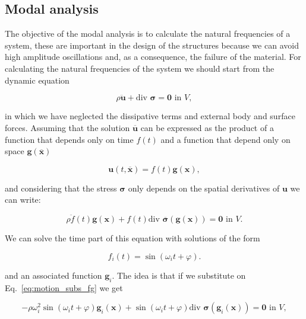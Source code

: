\documentclass[review]{elsarticle}
\begin{document}

\subsection{Modal analysis}

The objective of the modal analysis is to calculate the natural frequencies
of a system, these are important in the design of the structures because we can avoid 
high amplitude oscillations and, as a consequence, the failure of the material. 
For calculating the natural frequencies of the system we should start from the
dynamic equation  

\begin{equation}
\rho \ddot{\bm{u}} + \text{div } \bm{\sigma} = \bm{0} \text{ in } V,
\label{eq:motion}
\end{equation}

\noindent
in which we have neglected the dissipative terms and external body and surface
forces.
Assuming that the solution $\overline{\bm{u}}$ can be expressed as the
product of a function that depends only on time $f(t)$ and a function that
depend only on space $\bm{g}(\overline{\bm{x}})$ 

\begin{equation}
\bm{u}(t,\overline{\bm{x}}) = f(t) \bm{g}(\bm{x}),
\label{eq:u_fg}
\end{equation}

\noindent
and considering that the stress $\bm{\sigma}$ only depends on the
spatial derivatives of $\bm{u}$ we can write:

\begin{equation}
\rho \ddot{f}(t) \bm{g}(\bm{x}) +
f(t) \text{div } \overline{\bm{\sigma}}(\bm{g}(\bm{x}))
= \bm{0} \text{ in } V.
\label{eq:motion_subs_fg}
\end{equation}

We can solve the time part of this equation with solutions of the form

\begin{equation}
f_i(t) = \sin (\omega_i t + \varphi).
\label{eq:f_sin}
\end{equation}

\noindent
and an associated function $\bm{g}_i$. The idea is that if we substitute 
on Eq.~\ref{eq:motion_subs_fg} we get

\begin{equation}
- \rho \omega_i^2 \sin (\omega_i t + \varphi) \bm{g}_i(\bm{x}) +
\sin (\omega_i t + \varphi) \text{div } \bm{\sigma}(\bm{g}_i(\bm{x})) 
= \bm{0} \text{ in } V,
\label{eq:motion}
\end{equation}
\end{document}
